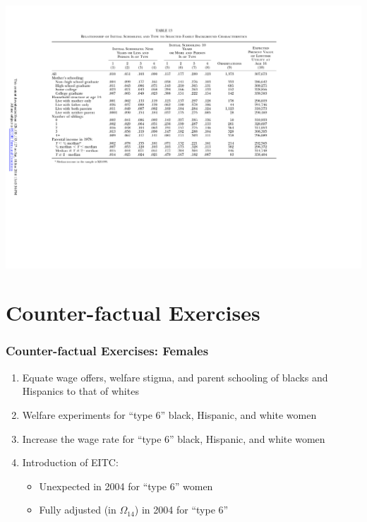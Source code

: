 \begin{frame}
\begin{center}
	\includegraphics{tab-figs/table13_1997_footer}	
	\end{center}
\end{frame}

\section{Counter-factual Exercises}

\begin{frame}
	\frametitle{Counter-factual Exercises: Females}
		\begin{enumerate}
			\item Equate wage offers, welfare stigma, and parent schooling of blacks and Hispanics to that of whites 
			\item Welfare experiments for ``type 6'' black, Hispanic, and white women 
			\item Increase the wage rate for ``type 6'' black, Hispanic, and white women
			\item Introduction of EITC:
				\begin{itemize}
					\item Unexpected in 2004 for ``type 6'' women
					\item Fully adjusted (in $\Omega_{14}$) in 2004 for ``type 6''
				\end{itemize}							
		\end{enumerate}
\end{frame}

